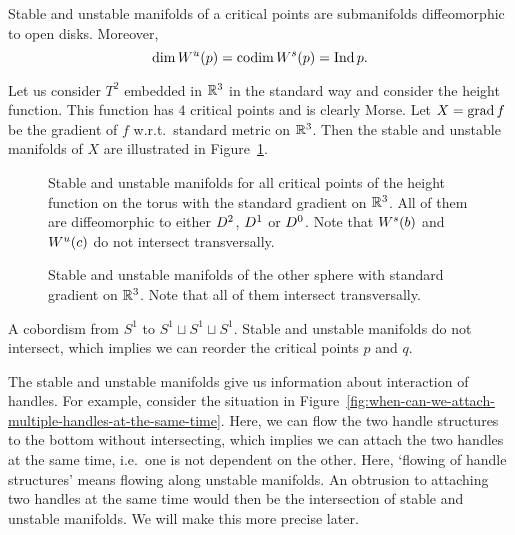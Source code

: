 \begin{prop}
    Stable and unstable manifolds of a critical points are submanifolds diffeomorphic to open disks. Moreover,
    \[
        \dim W^u(p) = \operatorname{codim} W^s(p) = \operatorname{Ind} p
    .\] 
\end{prop}


\begin{eg}
    Let us consider $T^{2}$ embedded in $\mathbb{R}^3$ in the standard way and consider the height function. 
    This function has $4$ critical points and is clearly Morse.
    Let $X = \operatorname{grad} f$ be the gradient of $f$ w.r.t.\ standard metric on $\mathbb{R}^{3}$.
    Then the stable and unstable manifolds of $X$ are illustrated in Figure~\ref{fig:torus-height-function-stable-and-unstable-manifolds}.
    \label{eg:torus-stable-unstable-manifolds-standard-gradient}
\end{eg}
    \begin{figure}[H]
        \centering
        \caption{
        Stable and unstable manifolds for all critical points of the height function on the torus with the standard gradient on $\mathbb{R}^3$.
    All of them are diffeomorphic to either $D^{2}$, $D^{1}$ or  $D^{0}$.
    Note that $W^s(b)$ and  $W^u(c)$ do not intersect transversally.
}
        \label{fig:torus-height-function-stable-and-unstable-manifolds}
    \end{figure}

    \begin{figure}[H]
        \centering
        \caption{
            Stable and unstable manifolds of the other sphere with standard gradient on $\mathbb{R}^3$.  Note that all of them intersect transversally.
        }
        \label{fig:other-sphere-definition-of-mathcal-m}
    \end{figure}


    \begin{marginfigure}
        \centering
        \caption{
            A cobordism from $S^{1}$ to $S^{1} \sqcup S^1 \sqcup S^1$.
            Stable and unstable manifolds do not intersect, which implies we can reorder the critical points $p$ and $q$.
        }
        \label{fig:when-can-we-attach-multiple-handles-at-the-same-time}
    \end{marginfigure}
    The stable and unstable manifolds give us information about interaction of handles.
    For example, consider the situation in Figure~\ref{fig:when-can-we-attach-multiple-handles-at-the-same-time}.
    Here, we can flow the two handle structures to the bottom without intersecting, which implies we can attach the two handles at the same time, i.e.\ one is not dependent on the other.
    Here, `flowing of handle structures' means flowing along unstable manifolds.
    An obtrusion to attaching two handles at the same time would then be the intersection of stable and unstable manifolds. We will make this more precise later.
